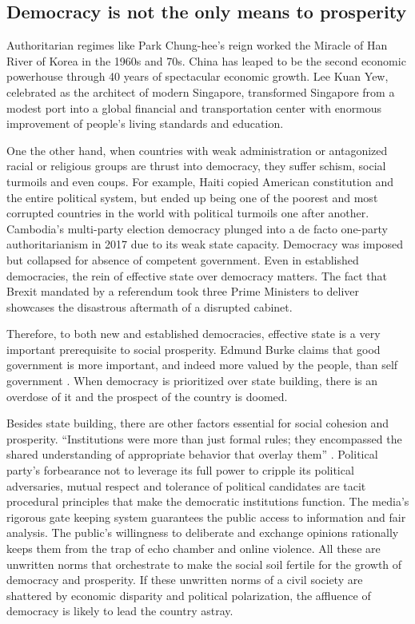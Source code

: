 \documentclass{scrartcl}
\theoremstyle{definition}
\begin{document}
\subsection{Democracy is not the only means to prosperity}

Authoritarian regimes like Park Chung-hee's reign worked the Miracle of Han River of Korea in the 1960s and 70s. China has leaped to be the second economic powerhouse through 40 years of spectacular economic growth. Lee Kuan Yew, celebrated as the architect of modern Singapore, transformed Singapore from a modest port into a global financial and transportation center with enormous improvement of people's living standards and education. 

One the other hand, when countries with weak administration or antagonized racial or religious groups are thrust into democracy, they suffer schism, social turmoils and even coups. For example, Haiti copied American constitution and the entire political system, but ended up being one of the poorest and most corrupted countries in the world with political turmoils one after another. Cambodia’s multi-party election democracy plunged into a de facto one-party authoritarianism in 2017 due to its weak state capacity. Democracy was imposed but collapsed for absence of competent government. Even in established democracies, the rein of effective state over democracy matters. The fact that Brexit mandated by a referendum took three Prime Ministers to deliver showcases the disastrous aftermath of a disrupted cabinet. 

Therefore, to both new and established democracies, effective state is a very important prerequisite to social prosperity. Edmund Burke claims that good government is more important, and indeed more valued by the people, than self government \autocite[70]{scand}. When democracy is prioritized over state building, there is an overdose of it and the prospect of the country is doomed. 

Besides state building, there are other factors essential for social cohesion and prosperity. ``Institutions were more than just formal rules; they encompassed the shared understanding of appropriate behavior that overlay them'' \autocite[213]{demdie}. Political party's forbearance not to leverage its full power to cripple its political adversaries, mutual respect and tolerance of political candidates are tacit procedural principles that make the democratic institutions function. The media's rigorous gate keeping system guarantees the public access to information and fair analysis. The public's willingness to deliberate and exchange opinions rationally keeps them from the trap of echo chamber and online violence. All these are unwritten norms that orchestrate to make the social soil fertile for the growth of democracy and prosperity. If these unwritten norms of a civil society are shattered by economic disparity and political polarization, the affluence of democracy is likely to lead the country astray. 
\end{document}
